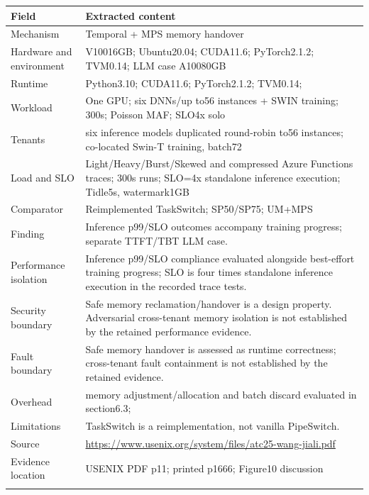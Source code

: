 \cite{P010}

\begin{longtable}{>{\raggedright\arraybackslash}p{}>{\raggedright\arraybackslash}p{}}
\toprule
\textbf{Field} & \textbf{Extracted content}\\\midrule\endhead
Mechanism & Temporal + MPS memory handover\\\addlinespace
Hardware and environment & V10016GB; Ubuntu20.04; CUDA11.6; PyTorch2.1.2; TVM0.14; LLM case A10080GB\\\addlinespace
Runtime & Python3.10; CUDA11.6; PyTorch2.1.2; TVM0.14;\\\addlinespace
Workload & One GPU; six DNNs/up to56 instances + SWIN training; 300s; Poisson MAF; SLO4x solo\\\addlinespace
Tenants & six inference models duplicated round-robin to56 instances; co-located Swin-T training, batch72\\\addlinespace
Load and SLO & Light/Heavy/Burst/Skewed and compressed Azure Functions traces; 300s runs; SLO=4x standalone inference execution; Tidle5s, watermark1GB\\\addlinespace
Comparator & Reimplemented TaskSwitch; SP50/SP75; UM+MPS\\\addlinespace
Finding & Inference p99/SLO outcomes accompany training progress; separate TTFT/TBT LLM case.\\\addlinespace
Performance isolation & Inference p99/SLO compliance evaluated alongside best-effort training progress; SLO is four times standalone inference execution in the recorded trace tests.\\\addlinespace
Security boundary & Safe memory reclamation/handover is a design property. Adversarial cross-tenant memory isolation is not established by the retained performance evidence.\\\addlinespace
Fault boundary & Safe memory handover is assessed as runtime correctness; cross-tenant fault containment is not established by the retained evidence.\\\addlinespace
Overhead & memory adjustment/allocation and batch discard evaluated in section6.3;\\\addlinespace
Limitations & TaskSwitch is a reimplementation, not vanilla PipeSwitch.\\\addlinespace
Source & \url{https://www.usenix.org/system/files/atc25-wang-jiali.pdf}\\\addlinespace
Evidence location & USENIX PDF p11; printed p1666; Figure10 discussion\\\addlinespace
\bottomrule\end{longtable}

